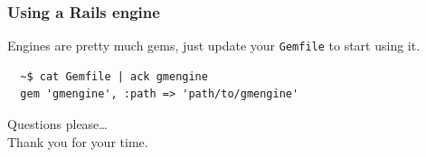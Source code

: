 \documentclass[compress]{beamer}
\begin{document}
\begin{frame}[fragile]
\frametitle{Using a Rails engine}
Engines are pretty much gems, just update your \texttt{Gemfile} to start using it.

\begin{verbatim}
  ~$ cat Gemfile | ack gmengine
  gem 'gmengine', :path => 'path/to/gmengine'
\end{verbatim}
\end{frame}

\begin{frame}
  \begin{center}
  \huge Questions please\ldots
  \\
  Thank you for your time.
  \end{center}
\end{frame}
\end{document}

